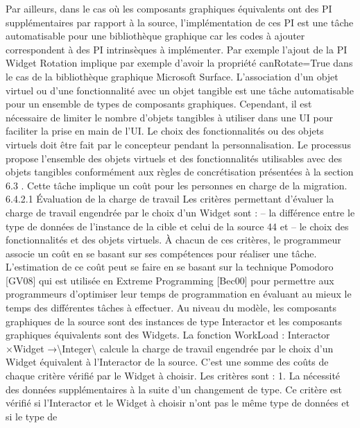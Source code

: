 \documentclass{article}
\begin{document}
Par ailleurs, dans le cas o\`{u} les composants graphiques \'{e}quivalents ont des PI suppl\'{e}mentaires par
rapport \`{a} la source, l’impl\'{e}mentation de ces PI est une t\^{a}che automatisable pour une biblioth\`{e}que
graphique car les codes \`{a} ajouter correspondent \`{a} des PI intrins\`{e}ques \`{a} impl\'{e}menter. Par exemple
l’ajout de la PI Widget Rotation implique par exemple d’avoir la propri\'{e}t\'{e} canRotate=True dans le
cas de la biblioth\`{e}que graphique Microsoft Surface.
L’association d’un objet virtuel ou d’une fonctionnalit\'{e} avec un objet tangible est une t\^{a}che automatisable pour un ensemble de types de composants graphiques. Cependant, il est n\'{e}cessaire de
limiter le nombre d’objets tangibles \`{a} utiliser dans une UI pour faciliter la prise en main de l’UI. Le
choix des fonctionnalit\'{e}s ou des objets virtuels doit \^{e}tre fait par le concepteur pendant la personnalisation. Le processus propose l’ensemble des objets virtuels et des fonctionnalit\'{e}s utilisables avec des
objets tangibles conform\'{e}ment aux r\`{e}gles de concr\'{e}tisation pr\'{e}sent\'{e}es \`{a} la section 6.3 . Cette t\^{a}che
implique un co\^{u}t pour les personnes en charge de la migration.
6.4.2.1
Évaluation de la charge de travail
Les crit\`{e}res permettant d’\'{e}valuer la charge de travail engendr\'{e}e par le choix d’un Widget sont :
– la diff\'{e}rence entre le type de donn\'{e}es de l’instance de la cible et celui de la source 44 et
– le choix des fonctionnalit\'{e}s et des objets virtuels.
À chacun de ces crit\`{e}res, le programmeur associe un co\^{u}t en se basant sur ses comp\'{e}tences pour
r\'{e}aliser une t\^{a}che. L’estimation de ce co\^{u}t peut se faire en se basant sur la technique Pomodoro [GV08]
qui est utilis\'{e}e en Extreme Programming [Bec00] pour permettre aux programmeurs d’optimiser leur
temps de programmation en \'{e}valuant au mieux le temps des diff\'{e}rentes t\^{a}ches \`{a} effectuer.
Au niveau du mod\`{e}le, les composants graphiques de la source sont des instances de type Interactor
et les composants graphiques \'{e}quivalents sont des Widgets. La fonction
WorkLoad : Interactor ×Widget →\textbackslash{}{Integer\textbackslash{}}
calcule la charge de travail engendr\'{e}e par le choix d’un Widget \'{e}quivalent \`{a} l’Interactor de la source.
C’est une somme des co\^{u}ts de chaque crit\`{e}re v\'{e}riﬁ\'{e} par le Widget \`{a} choisir. Les crit\`{e}res sont :
1. La n\'{e}cessit\'{e} des donn\'{e}es suppl\'{e}mentaires \`{a} la suite d’un changement de type. Ce crit\`{e}re est
v\'{e}riﬁ\'{e} si l’Interactor et le Widget \`{a} choisir n’ont pas le m\^{e}me type de donn\'{e}es et si le type de
\end{document}
